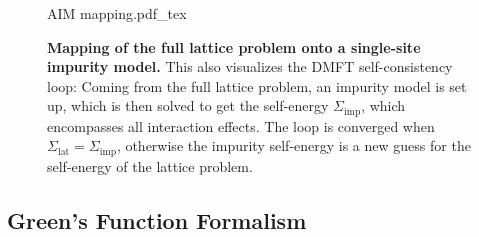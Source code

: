 \documentclass[../main.tex]{subfiles}
\begin{document}
\begin{figure}[t]
	\centering
	{AIM mapping.pdf_tex}
	\caption[Mapping of the full lattice problem onto a single-site impurity model.]{\textbf{Mapping of the full lattice problem onto a single-site impurity model.} This also visualizes the DMFT self-consistency loop: Coming from the full lattice problem, an impurity model is set up, which is then solved to get the self-energy \(\Sigma_{\mathrm{imp}}\), which encompasses all interaction effects. The loop is converged when \(\Sigma_{\mathrm{lat}} = \Sigma_{\mathrm{imp}}\), otherwise the impurity self-energy is a new guess for the self-energy of the lattice problem.}
	\label{fig:DMFT AIM mapping}
\end{figure}

\subsection*{Green's Function Formalism}
\end{document}
